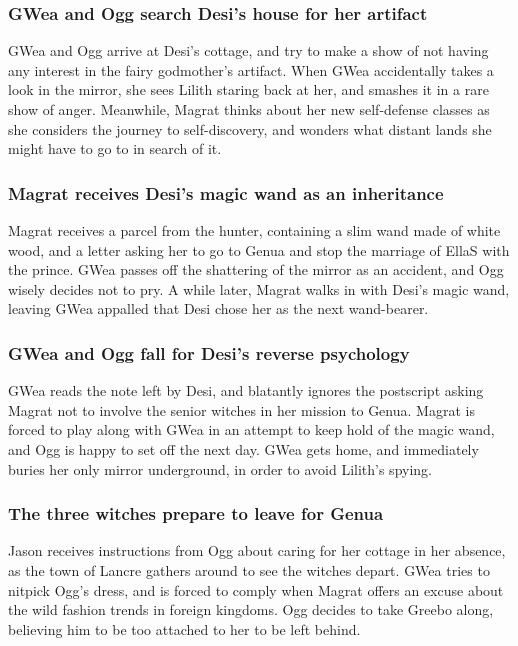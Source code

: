 \subsubsection{\Gls{GWea} and \Gls{Ogg} search \Gls{Desi}'s house for her artifact}
\Gls{GWea} and \Gls{Ogg} arrive at \Gls{Desi}'s cottage, and try to make a show of not having any
interest in the fairy godmother's artifact. When \Gls{GWea} accidentally takes a look in the mirror,
she sees \Gls{Lilith} staring back at her, and smashes it in a rare show of anger. Meanwhile,
\Gls{Magrat} thinks about her new self-defense classes as she considers the journey to
self-discovery, and wonders what distant lands she might have to go to in search of it.

\subsubsection{\Gls{Magrat} receives \Gls{Desi}'s magic wand as an inheritance}
\Gls{Magrat} receives a parcel from the hunter, containing a slim wand made of white wood, and a
letter asking her to go to Genua and stop the marriage of \Gls{EllaS} with the prince. \Gls{GWea}
passes off the shattering of the mirror as an accident, and \Gls{Ogg} wisely decides not to pry.
A while later, \Gls{Magrat} walks in with \Gls{Desi}'s magic wand, leaving \Gls{GWea} appalled that
\Gls{Desi} chose her as the next wand-bearer.

\subsubsection{\Gls{GWea} and \Gls{Ogg} fall for \Gls{Desi}'s reverse psychology}
\Gls{GWea} reads the note left by \Gls{Desi}, and blatantly ignores the postscript asking
\Gls{Magrat} not to involve the senior witches in her mission to Genua. \Gls{Magrat} is forced to
play along with \Gls{GWea} in an attempt to keep hold of the magic wand, and \Gls{Ogg} is happy to
set off the next day. \Gls{GWea} gets home, and immediately buries her only mirror underground, in
order to avoid \Gls{Lilith}'s spying.

\subsubsection{The three witches prepare to leave for Genua}
\Gls{Jason} receives instructions from \Gls{Ogg} about caring for her cottage in her absence, as
the town of Lancre gathers around to see the witches depart. \Gls{GWea} tries to nitpick \Gls{Ogg}'s
dress, and is forced to comply when \Gls{Magrat} offers an excuse about the wild fashion trends in
foreign kingdoms. \Gls{Ogg} decides to take \Gls{Greebo} along, believing him to be too attached
to her to be left behind.

